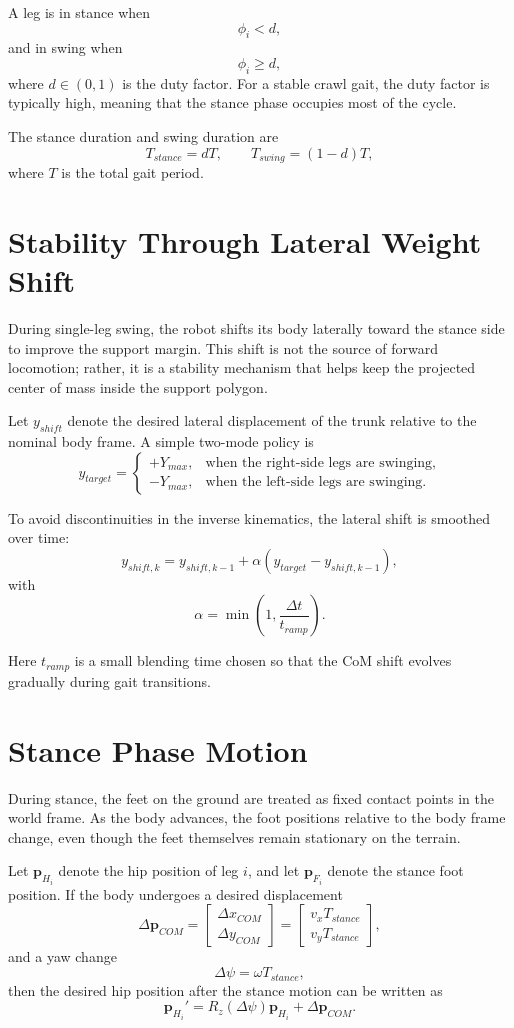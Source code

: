 \documentclass[11pt,a4paper]{report}
\begin{document}
A leg is in stance when
\[
\phi_i < d,
\]
and in swing when
\[
\phi_i \ge d,
\]
where \(d \in (0,1)\) is the duty factor. For a stable crawl gait, the duty factor is typically high, meaning that the stance phase occupies most of the cycle.

The stance duration and swing duration are
\[
T_{stance} = dT, \qquad T_{swing} = (1-d)T,
\]
where \(T\) is the total gait period.

\section{Stability Through Lateral Weight Shift}

During single-leg swing, the robot shifts its body laterally toward the stance side to improve the support margin. This shift is not the source of forward locomotion; rather, it is a stability mechanism that helps keep the projected center of mass inside the support polygon.

Let \(y_{shift}\) denote the desired lateral displacement of the trunk relative to the nominal body frame. A simple two-mode policy is
\[
y_{target} =
\begin{cases}
+Y_{max}, & \text{when the right-side legs are swinging},\\
-Y_{max}, & \text{when the left-side legs are swinging}.
\end{cases}
\]

To avoid discontinuities in the inverse kinematics, the lateral shift is smoothed over time:
\[
y_{shift,k} = y_{shift,k-1} + \alpha (y_{target} - y_{shift,k-1}),
\]
with
\[
\alpha = \min\!\left(1, \frac{\Delta t}{t_{ramp}}\right).
\]

Here \(t_{ramp}\) is a small blending time chosen so that the CoM shift evolves gradually during gait transitions.

\section{Stance Phase Motion}

During stance, the feet on the ground are treated as fixed contact points in the world frame. As the body advances, the foot positions relative to the body frame change, even though the feet themselves remain stationary on the terrain.

Let \(\mathbf{p}_{H_i}\) denote the hip position of leg \(i\), and let \(\mathbf{p}_{F_i}\) denote the stance foot position. If the body undergoes a desired displacement
\[
\Delta \mathbf{p}_{COM} =
\begin{bmatrix}
\Delta x_{COM}\\
\Delta y_{COM}
\end{bmatrix}
=
\begin{bmatrix}
v_x T_{stance}\\
v_y T_{stance}
\end{bmatrix},
\]
and a yaw change
\[
\Delta \psi = \omega T_{stance},
\]
then the desired hip position after the stance motion can be written as
\[
\mathbf{p}_{H_i}' = R_z(\Delta \psi)\mathbf{p}_{H_i} + \Delta \mathbf{p}_{COM}.
\]
\end{document}
